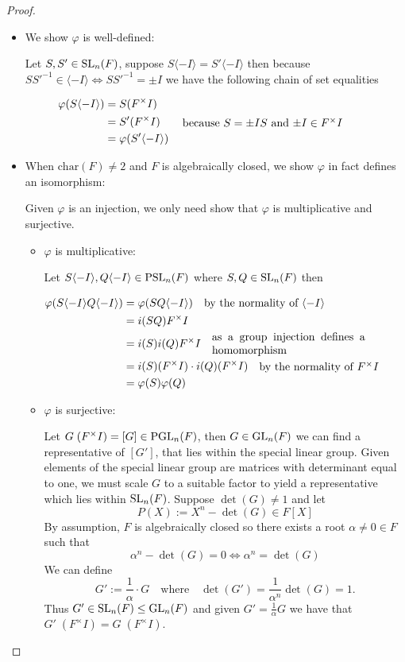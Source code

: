 \begin{proof}
\begin{itemize}
    \item We show $\varphi$ is well-defined:

Let $S, S' \in \operatorname{SL}_n(F)$, suppose $S \langle -I\rangle = S'\langle -I\rangle$ then because $SS'^{-1} \in \langle -I\rangle \iff SS'^{-1} = \pm I$ we have the following chain of set equalities

\begin{align*}
    \varphi(S \langle -I \rangle) 
    &= S (F^\times I)\\
    &= S' (F^\times I) \qquad \parbox[c]{0.5
    \linewidth}{because $S = \pm I S$ and $\pm I \in F^\times I$}\\
    &= \varphi(S' \langle -I\rangle)
\end{align*}

\item When $\textrm{char}(F) \ne 2$ and $F$ is algebraically closed, we show $\varphi$ in fact defines an isomorphism:

Given $\varphi$ is an injection, we only need show that $\varphi$ is multiplicative and surjective.
\begin{itemize}
    \item $\varphi$ is multiplicative:

    Let $S \langle-I\rangle, Q\langle-I\rangle \in \operatorname{PSL}_n(F)$ where $S, Q \in \operatorname{SL}_n(F)$ then

    \begin{align*}
    \varphi(S \langle-I\rangle  Q\langle-I\rangle ) &= \varphi(SQ \langle -I\rangle) \quad \parbox[c]{0.4\linewidth}{by the normality of $\langle -I \rangle$}\\
    &= i(SQ) F^\times I\\
    &= i(S) i(Q) F^\times I \quad  \parbox[c]{0.4\linewidth}{as a group injection defines a homomorphism}\\
    &= i(S) (F^\times I) \cdot i(Q)(F^\times I) \quad \parbox[c] {0.4\linewidth}{ by the normality of $F^\times I$}\\
    &= \varphi(S) \varphi(Q)
    \end{align*}
    
    \item $\varphi$ is surjective:

    Let $G \; (F^\times I) = [G] \in \operatorname{PGL}_n(F)$, then $G \in \operatorname{GL}_n(F)$ we can find a representative of $[G']$, that lies within the special linear group.
    Given elements of the special linear group are matrices with determinant equal to one, we must scale $G$ to a suitable factor to yield a representative which lies within $\operatorname{SL}_n(F)$. Suppose $\det(G) \ne 1$ and let
    \[
    P(X) := X^n - \det(G) \in F[X]
    \]
    By assumption, $F$ is algebraically closed so there exists a root $\alpha \ne 0\in F$ such that 
    \[
    \alpha^n - \det(G) = 0 \iff \alpha^n = \det(G)
    \]
    We can define
    \[
    G' := \frac{1}{\alpha} \cdot G \quad \text{where} \quad \det(G') = \frac{1}{\alpha^n} \det(G) = 1.
    \]
    Thus $G' \in \operatorname{SL}_n(F) \leq \operatorname{GL}_n(F)$ and given $G' = \frac{1}{\alpha} G$ we have that $G'  \; (F^\times I) = G \; (F^\times I)$.
    

\end{itemize}
\end{itemize}
\end{proof}
